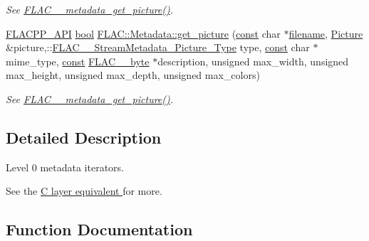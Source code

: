 \begin{DoxyCompactItemize}
\begin{DoxyCompactList}\small\item\em See \hyperlink{group__flac__metadata__level0_gaa13138ab038694909964998a113817b4}{F\+L\+A\+C\+\_\+\+\_\+metadata\+\_\+get\+\_\+picture()}. \end{DoxyCompactList}\item 
\hyperlink{group__flacpp__export_gaec3a801bf18630403eda6dc2f8c4927a}{F\+L\+A\+C\+P\+P\+\_\+\+A\+PI} \hyperlink{mac_2config_2i386_2lib-src_2libsoxr_2soxr-config_8h_abb452686968e48b67397da5f97445f5b}{bool} \hyperlink{group__flacpp__metadata__level0_gab99326ba601186b2893383f13cdd0f38}{F\+L\+A\+C\+::\+Metadata\+::get\+\_\+picture} (\hyperlink{getopt1_8c_a2c212835823e3c54a8ab6d95c652660e}{const} char $\ast$\hyperlink{test__portburn_8cpp_a7efa5e9c7494c7d4586359300221aa5d}{filename}, \hyperlink{vda_8h_a63024b9f4f18a0420b1e71b49205d3ca}{Picture} \&picture,\+::\hyperlink{group__flac__format_gaf6d3e836cee023e0b8d897f1fdc9825d}{F\+L\+A\+C\+\_\+\+\_\+\+Stream\+Metadata\+\_\+\+Picture\+\_\+\+Type} type, \hyperlink{getopt1_8c_a2c212835823e3c54a8ab6d95c652660e}{const} char $\ast$mime\+\_\+type, \hyperlink{getopt1_8c_a2c212835823e3c54a8ab6d95c652660e}{const} \hyperlink{ordinals_8h_a5eb569b12d5b047cdacada4d57924ee3}{F\+L\+A\+C\+\_\+\+\_\+byte} $\ast$description, unsigned max\+\_\+width, unsigned max\+\_\+height, unsigned max\+\_\+depth, unsigned max\+\_\+colors)
\begin{DoxyCompactList}\small\item\em See \hyperlink{group__flac__metadata__level0_gaa13138ab038694909964998a113817b4}{F\+L\+A\+C\+\_\+\+\_\+metadata\+\_\+get\+\_\+picture()}. \end{DoxyCompactList}\end{DoxyCompactItemize}


\subsection{Detailed Description}
Level 0 metadata iterators. 

See the \hyperlink{group__flac__metadata__level0}{C layer equivalent } for more. 

\subsection{Function Documentation}
